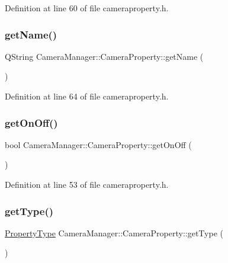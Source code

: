Definition at line 60 of file cameraproperty.\+h.

\mbox{\label{class_camera_manager_1_1_camera_property_a789075edb5350c79f7fd807f3360d7e4}} 
\subsubsection{\texorpdfstring{getName()}{getName()}}
{\footnotesize\ttfamily Q\+String Camera\+Manager\+::\+Camera\+Property\+::get\+Name (\begin{DoxyParamCaption}{ }\end{DoxyParamCaption})\hspace{0.3cm}{\ttfamily [inline]}}



Definition at line 64 of file cameraproperty.\+h.

\mbox{\label{class_camera_manager_1_1_camera_property_a9e78cc25ce3d0a22429852c3b6b4007d}} 
\subsubsection{\texorpdfstring{getOnOff()}{getOnOff()}}
{\footnotesize\ttfamily bool Camera\+Manager\+::\+Camera\+Property\+::get\+On\+Off (\begin{DoxyParamCaption}{ }\end{DoxyParamCaption})\hspace{0.3cm}{\ttfamily [inline]}}



Definition at line 53 of file cameraproperty.\+h.

\mbox{\label{class_camera_manager_1_1_camera_property_abba29ee03832b7036f2d828223a5e26d}} 
\subsubsection{\texorpdfstring{getType()}{getType()}}
{\footnotesize\ttfamily \mbox{\hyperlink{namespace_camera_manager_a91c5befa73ac521c804690839ad888ab}{Property\+Type}} Camera\+Manager\+::\+Camera\+Property\+::get\+Type (\begin{DoxyParamCaption}{ }\end{DoxyParamCaption})\hspace{0.3cm}{\ttfamily [inline]}}



